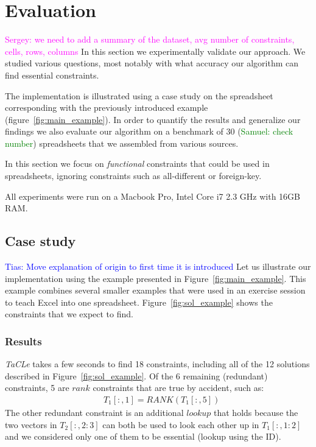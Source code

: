 \documentclass{IEEEtran}
\newcommand{\sergey}[1]{\textcolor{magenta}{{\sc Sergey:} #1}\xspace}
\newcommand{\samuel}[1]{\textcolor{green}{{\sc Samuel:} #1}\xspace}
\newcommand{\tias}[1]{\textcolor{blue}{{\sc Tias:} #1}\xspace}
\newcommand{\format}[1]{\textit{#1}\xspace}
\newcommand{\sname}{\format{TaCLe}}
\newcommand{\range}[3]{\ensuremath{#1[#2,#3]}}
\newcommand{\rangeto}[2]{#1{:}#2}
\newcommand{\rangeall}{:}
\newcommand{\eccalc}[2]{\ensuremath{#1 = #2}}
\newcommand{\ecrank}[2]{\eccalc{#1}{\textit{RANK}(#2)}}
\theoremstyle{definition}
\begin{document}

\newcommand{\runtotal}{16.12}
\newcommand{\runtotalstd}{0.62}

\newcommand{\runfile}{0.50}
\newcommand{\runfilestd}{0.02}

\section{Evaluation}\label{sec:evaluation}
\sergey{we need to add a summary of the dataset, avg number of constraints, cells, rows, columns}
In this section we experimentally validate our approach.
We studied various questions, most notably with what accuracy our algorithm can find essential constraints.

The implementation is illustrated using a case study on the spreadsheet corresponding with the previously introduced example (figure~\ref{fig:main_example}).
In order to quantify the results and generalize our findings we also evaluate our algorithm on a benchmark of 30 (\samuel{check number}) spreadsheets that we assembled from various sources.

In this section we focus on \textit{functional} constraints that could be used in spreadsheets, ignoring constraints such as all-different or foreign-key.

All experiments were run on a Macbook Pro, Intel Core i7 2.3 GHz with 16GB RAM.

\subsection{Case study}
\tias{Move explanation of origin to first time it is introduced}
Let us illustrate our implementation using the example presented in Figure~\ref{fig:main_example}.
This example combines several smaller examples that were used in an exercise session to teach Excel into one spreadsheet.
Figure~\ref{fig:sol_example} shows the constraints that we expect to find.

\subsubsection{Results}
\sname takes a few seconds to find 18 constraints, including all of the 12 solutions described in Figure~\ref{fig:sol_example}.
Of the 6 remaining (redundant) constraints, 5 are $\mathit{rank}$ constraints that are true by accident, such as: \begin{align*}
  & \ecrank{\range{T_1}{\rangeall}{1}}{\range{T_1}{\rangeall}{5}}
\end{align*}
The other redundant constraint is an additional $\mathit{lookup}$ that holds because the two vectors in \range{T_2}{\rangeall}{\rangeto{2}{3}} can both be used to look each other up in \range{T_1}{\rangeall}{\rangeto{1}{2}} and we considered only one of them to be essential (lookup using the ID).
\end{document}
